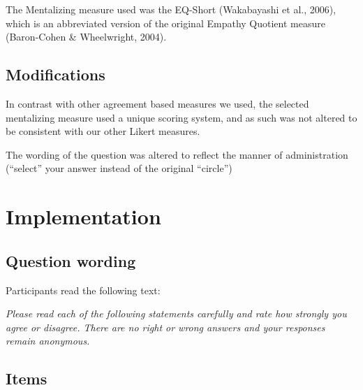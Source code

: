 \documentclass[
  letterpaper,
]{scrbook}
\begin{document}
The Mentalizing measure used was the EQ-Short (Wakabayashi et al.,
2006), which is an abbreviated version of the original Empathy Quotient
measure (Baron-Cohen \& Wheelwright, 2004).

\subsection{Modifications}\label{modifications-9}

In contrast with other agreement based measures we used, the selected
mentalizing measure used a unique scoring system, and as such was not
altered to be consistent with our other Likert measures.

The wording of the question was altered to reflect the manner of
administration (``select'' your answer instead of the original
``circle'')

\section{Implementation}\label{implementation-10}

\subsection*{Question wording}\label{question-wording-10}

Participants read the following text:

\emph{Please read each of the following statements carefully and rate
how strongly you agree or disagree. There are no right or wrong answers
and your responses remain anonymous.}

\subsection*{Items}\label{items-10}
\end{document}
